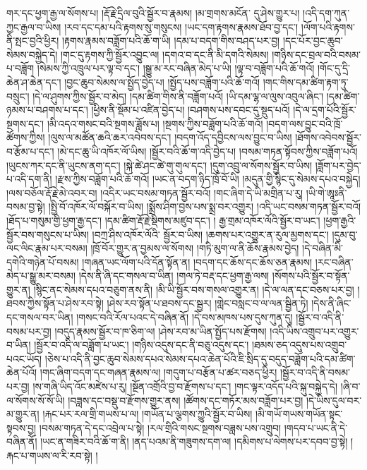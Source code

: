 གར་དང་ཕྱག་རྒྱ་ལ་སོགས་པ། །རྡོ་རྗེ་དྲིལ་བུའི་སྦྱོར་བ་རྣམས། །མ་གྲགས་མངོན་​ དུ་ཤེས་གྱུར་པ། །འདི་དག་ཀུན་ཀྱང་རྒྱལ་བ་ཡིས། །རབ་དང་དམ་པའི་རྟགས་སུ་གསུངས། །ཡང་དག་རྟགས་རྣམས་ཐོབ་བྱ་དང་། །ལོག་པའི་རྟགས་ནི་སྤང་བྱའི་ཕྱིར། །རྟགས་རྣམས་བཟློག་པའི་ཆོ་ག་ཡི། །དམ་པ་བདག་གིས་བཤད་པར་བྱ། །དང་པོར་བྱང་ཆུབ་སེམས་བསྐྱེད་དེ། །གང་དུ་རྟགས་ཀྱི་སྦྱོར་འབྱུང་ལ། །དགའ་བ་དང་ནི་མི་དགའི་སེམས། །གཉིས་དང་བྲལ་བའི་བསམ་པ་བཟློག །སེམས་ཀྱི་འཁྲུལ་པར་ལྟ་བ་དང་། །སྒྱུ་མ་རང་བཞིན་མེད་པ་ཡི། །ལྟ་བ་བཟློག་པའི་ཆོ་གའོ། །གོང་དུ་དྲི་ཆེན་ཤ་ཆེན་དང་། །བྱང་ཆུབ་སེམས་ལ་སྤྱོད་བྱེད་པ། །སྤྱོད་པས་བཟློག་པའི་ཆོ་གའོ། །གང་གིས་དམ་ཚིག་རྟག་ཏུ་བསྲུང་། །དེ་ལ་ཤུགས་ཀྱིས་སྦྱོར་བ་མེད། །དམ་ཚིག་གིས་ནི་བཟློག་པའོ། །ཡི་དམ་ལྷ་ལ་ལུས་འབུལ་ཞིང་། །དམ་ཚིག་ཉམས་པ་བཤགས་པ་དང་། །ཕྱིས་ནི་སྡོམ་པ་འཛིན་བྱེད་པ། །བཤགས་པས་དབང་དུ་སྡུད་པའོ། །དེ་ལ་དྲག་པོའི་སྦྱོར་སྔགས་དང་། །མི་འདའ་གསང་བའི་སྔགས་ཟློས་པ། །སྔགས་ཀྱིས་བཟློག་པའི་ཆོ་གའོ། །བདག་ལས་བྱུང་བའི་ཁྲོ་ཚོགས་ཀྱིས། །ལུས་ལ་མཚོན་ཆའི་ཆར་འབེབས་དང་། །བདག་འོད་དབྱིངས་ལས་བྱུང་བ་ཡིས། །ཐོགས་འབེབས་སྦྱོར་བ་རྩོམ་པ་དང་། །མེ་དང་ཆུ་ཡི་འཁོར་ལོ་ཡིས། །སྦྱོར་བའི་ཆོ་ག་འདི་བྱེད་པ། །བསམ་གཏན་སྟོབས་ཀྱིས་བཟློག་པའོ། །ཡུངས་ཀར་དང་ནི་ཡུངས་ནག་དང་། །སྐེ་ཚེ་ཤང་ཚེ་གུ་གུལ་དང་། །དུག་འབྲུ་ལ་སོགས་སྦྱོར་བ་ཡིས། །ཟློག་པར་བྱེད་པ་འདི་དག་ནི། །རྫས་ཀྱིས་བཟློག་པའི་ཆོ་གའོ། །ཡང་ན་བདག་ཉིད་ཁྲོ་བོ་ཡི། །མདུན་གྱི་སྙིང་དུ་སེམས་དཔའ་བསྐྱེད། །ལས་བཅོལ་རྡོ་རྗེ་མེ་འབར་བ། །འདིར་ཡང་བསམ་གཏན་སྦྱོར་བའོ། །གང་ཞིག་དེ་ཡི་མགྲིན་པ་རུ། །ཡི་གེ་ཨཱཿནི་བསམ་བྱ་སྟེ། །སྤྱི་བོ་འཁོར་ལོ་བསྐོར་བ་ཡིས། །སྨྲོས་ཤིག་བྱས་པས་སྨྲ་བར་འགྱུར། །འདི་ཡང་བསམ་གཏན་སྦྱོར་བའོ། །ཐོད་པ་གསུམ་གྱི་ཕྱག་རྒྱ་དང་། །དམ་ཚིག་རྡོ་རྗེ་སྡིགས་མཛུབ་དང་། །
རྒྱ་གྲམ་འཁོར་ལོའི་སྦྱོར་བ་ཡང་། །ཕྱག་རྒྱའི་སྦྱོར་བས་གསུངས་པ་ཡིས། །བཀྲ་ཤིས་འཁོར་ལོའི་​ སྦྱོར་བ་ཡིས། །ཆགས་པར་འགྱུར་ན་རུལ་མྱགས་དང་། །དུམ་བུ་ལང་ལིང་རྣམ་པར་བསམ། །ཁྲོ་བོར་གྱུར་ན་བྱམས་ལ་སོགས། །གཏི་མུག་ལ་ནི་ཆོས་རྣམས་བྱེད། །དེ་བཞིན་མི་དགེའི་གཉེན་པོ་བསམ། །གཞན་ཡང་ལོག་པའི་དོན་སྟོན་ན། །བདག་དང་ཆོས་དང་ཆོས་ཅན་རྣམས། །རང་བཞིན་མེད་པ་སྒྱུ་མར་བསམ། །དེས་ནི་ཞི་དང་གསལ་བ་ཡིན། །གལ་ཏེ་བརྡ་དང་ཕྱག་རྒྱ་ལས། །སོགས་པའི་སྦྱོར་བ་སྟོན་གྱུར་ན། །སྙིང་ནང་སེམས་དཔའ་བཅུག་ནས་ནི། །མི་ཡི་སྦྱོར་བས་གསལ་འགྱུར་ན། །དེ་ལ་ལན་དང་བཅས་པར་བྱ། །ཐབས་ཀྱིས་སྟོན་པ་ཤེས་རབ་སྟེ། །ཤེས་རབ་སྟོན་པ་ཐབས་དང་སྦྱར། །གླེང་བསླང་བ་ལ་ལན་སྦྱིན་ཏེ། །དེས་ནི་ཞིང་དང་གསལ་བར་ཡིན། །གསང་བའི་རོལ་པའང་དེ་བཞིན་ནོ། །དེ་བས་མཁས་པས་དུས་ཀུན་དུ། །སྦྱོར་བ་འདི་ནི་བསམ་པར་བྱ། །བདུད་རྣམས་སྦྱོར་བ་ཁ་ཅིག་ལ། །ཤེས་རབ་མ་ཡིན་སྤྱོད་པས་རྫོགས། །འདི་ཡིས་འགྲུབ་པར་འགྱུར་བ་ཡིན། །སྦྱོར་བ་འདི་ལ་བཟློག་པ་ཡང་། །གཉིས་འདུས་དང་ནི་བཅུ་འདུས་དང་། །ཐམས་ཅད་འདུས་པས་འགྲུབ་པའང་ཡོད། །ཅེས་པ་འདི་ནི་བྱང་ཆུབ་སེམས་དཔའ་སེམས་དཔའ་ཆེན་པོའི་ཇི་སྲིད་དུ་བདུད་བཟློག་པའི་དམ་ཚིག་ཆེན་པོའོ། །གང་ཞིག་བདག་དང་གཞན་རྣམས་ལ། །གདུག་པ་བརྩོན་པ་ཚར་བཅད་ཕྱིར། །སྦྱོར་བ་འདི་ནི་བསམ་པར་བྱ། །ས་གཞི་ཡིད་འོང་མཛེས་པ་རུ། །སྔོན་འགྲོའི་བྱ་བ་རྫོགས་པ་དང་། །གང་ལྟར་འདོད་པའི་སྐུ་བསྐྱེད་དེ། །ཞི་བ་ལ་སོགས་སོ་སོ་ཡི། །བཟླས་དང་བསྡུ་བ་རྫོགས་གྱུར་ནས། །ཚོགས་དང་གཏོར་མས་བཟློག་པར་བྱ། །དེ་ཡིས་དུལ་བར་མ་གྱུར་ན། །རྐང་པར་རལ་གྲི་གཡས་པ་ལ། །གཡོན་པ་ལྕགས་ཀྱུའི་སྦྱོར་བ་ཡིས། །མི་གཡོ་གཡས་གཡོན་སྟང་སྟབས་བྱ། །བསམ་གཏན་དེ་དང་འབྲེལ་པ་སྟེ། །རལ་གྲིའི་གསང་སྔགས་བཟླས་པས་འགྲུབ། །གདབ་པ་ཡང་ནི་དེ་བཞིན་ནོ། །ཡང་ན་གཟིར་བའི་ཆོ་ག་ནི། །ནད་པའམ་ནི་གཟུགས་དག་ལ། །དམིགས་པ་ལེགས་པར་དབབ་བྱ་སྟེ། །རྐང་པ་གཡས་ལ་རི་རབ་སྟེ། །
